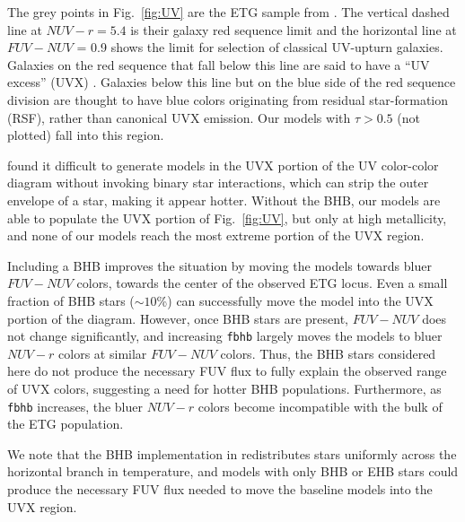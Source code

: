 The grey points in Fig.~\ref{fig:UV} are the ETG sample from \citet{Hernandez+2014}. The vertical dashed line at $NUV-r=5.4$ is their galaxy red sequence limit and the horizontal line at $FUV-NUV$ = 0.9 shows the limit for selection of classical UV-upturn galaxies. Galaxies on the red sequence that fall below this line are said to have a ``UV excess'' (UVX) \citep{Smith+2014}. Galaxies below this line but on the blue side of the red sequence division are thought to have blue colors originating from residual star-formation (RSF), rather than canonical UVX emission. Our models with $\tau > 0.5$ (not plotted) fall into this region.

\citet{Hernandez+2014} found it difficult to generate models in the UVX portion of the UV color-color diagram without invoking binary star interactions, which can strip the outer envelope of a star, making it appear hotter. Without the BHB, our models are able to populate the UVX portion of Fig.~\ref{fig:UV}, but only at high metallicity, and none of our models reach the most extreme portion of the UVX region.

Including a BHB improves the situation by moving the models towards bluer $FUV - NUV$ colors, towards the center of the observed ETG locus. Even a small fraction of BHB stars (${\sim}10$\%) can successfully move the model into the UVX portion of the diagram. However, once BHB stars are present, $FUV-NUV$ does not change significantly, and increasing {\tt fbhb} largely moves the models to bluer $NUV-r$ colors at similar $FUV-NUV$ colors. Thus, the BHB stars considered here do not produce the necessary FUV flux to fully explain the observed range of UVX colors, suggesting a need for hotter BHB populations. Furthermore, as {\tt fbhb} increases, the bluer $NUV - r$ colors become incompatible with the bulk of the ETG population.

We note that the BHB implementation in \FSPS redistributes stars uniformly across the horizontal branch in temperature, and models with only BHB or EHB stars could produce the necessary FUV flux needed to move the baseline models into the UVX region.

